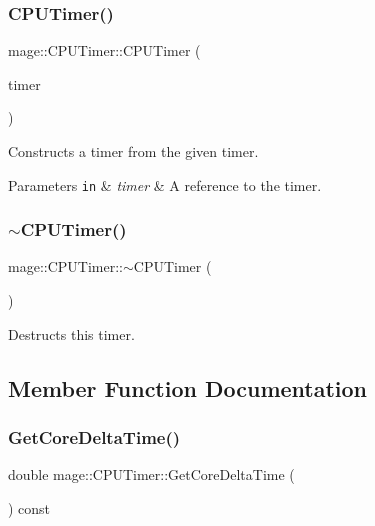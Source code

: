 \subsubsection{\texorpdfstring{C\+P\+U\+Timer()}{CPUTimer()}\hspace{0.1cm}{\footnotesize\ttfamily [3/3]}}
{\footnotesize\ttfamily mage\+::\+C\+P\+U\+Timer\+::\+C\+P\+U\+Timer (\begin{DoxyParamCaption}\item[{\hyperlink{classmage_1_1_c_p_u_timer}{C\+P\+U\+Timer} \&\&}]{timer }\end{DoxyParamCaption})\hspace{0.3cm}{\ttfamily [default]}}

Constructs a timer from the given timer.


\begin{DoxyParams}[1]{Parameters}
\mbox{\tt in}  & {\em timer} & A reference to the timer. \\
\hline
\end{DoxyParams}
\hypertarget{classmage_1_1_c_p_u_timer_a32583449026cf0589104767339486d4b}{}\label{classmage_1_1_c_p_u_timer_a32583449026cf0589104767339486d4b} 
\subsubsection{\texorpdfstring{$\sim$\+C\+P\+U\+Timer()}{~CPUTimer()}}
{\footnotesize\ttfamily mage\+::\+C\+P\+U\+Timer\+::$\sim$\+C\+P\+U\+Timer (\begin{DoxyParamCaption}{ }\end{DoxyParamCaption})\hspace{0.3cm}{\ttfamily [default]}}

Destructs this timer. 

\subsection{Member Function Documentation}
\hypertarget{classmage_1_1_c_p_u_timer_abb3526d1aca4511e1f6f7cfec53bf15a}{}\label{classmage_1_1_c_p_u_timer_abb3526d1aca4511e1f6f7cfec53bf15a} 
\subsubsection{\texorpdfstring{Get\+Core\+Delta\+Time()}{GetCoreDeltaTime()}}
{\footnotesize\ttfamily double mage\+::\+C\+P\+U\+Timer\+::\+Get\+Core\+Delta\+Time (\begin{DoxyParamCaption}{ }\end{DoxyParamCaption}) const}

